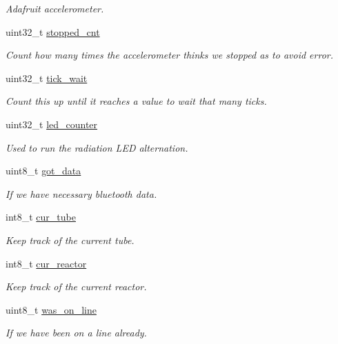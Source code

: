\begin{DoxyCompactItemize}
\begin{DoxyCompactList}\small\item\em Adafruit accelerometer. \end{DoxyCompactList}\item 
uint32\+\_\+t \hyperlink{class_threaded_robot_a638cd7916d1c1c8a83d15c47a8fe6ef0}{stopped\+\_\+cnt}
\begin{DoxyCompactList}\small\item\em Count how many times the accelerometer thinks we stopped as to avoid error. \end{DoxyCompactList}\item 
uint32\+\_\+t \hyperlink{class_threaded_robot_a314047099d4d38a60d54cc8b81012c7c}{tick\+\_\+wait}
\begin{DoxyCompactList}\small\item\em Count this up until it reaches a value to wait that many ticks. \end{DoxyCompactList}\item 
uint32\+\_\+t \hyperlink{class_threaded_robot_a857a1c5a3488176bd5a4bafc1b6d1d89}{led\+\_\+counter}
\begin{DoxyCompactList}\small\item\em Used to run the radiation L\+ED alternation. \end{DoxyCompactList}\item 
uint8\+\_\+t \hyperlink{class_threaded_robot_a506989a00617c30a8a1930773a0b7d41}{got\+\_\+data}
\begin{DoxyCompactList}\small\item\em If we have necessary bluetooth data. \end{DoxyCompactList}\item 
int8\+\_\+t \hyperlink{class_threaded_robot_ac68916b337d845b298d7e66f2f9261d7}{cur\+\_\+tube}
\begin{DoxyCompactList}\small\item\em Keep track of the current tube. \end{DoxyCompactList}\item 
int8\+\_\+t \hyperlink{class_threaded_robot_a3c2f2358f32ba58846b13e95b3c55527}{cur\+\_\+reactor}
\begin{DoxyCompactList}\small\item\em Keep track of the current reactor. \end{DoxyCompactList}\item 
uint8\+\_\+t \hyperlink{class_threaded_robot_a8d78ef13e34e29ab23aafedcdddc4ae4}{was\+\_\+on\+\_\+line}
\begin{DoxyCompactList}\small\item\em If we have been on a line already. \end{DoxyCompactList}\item 

\end{DoxyCompactItemize}
